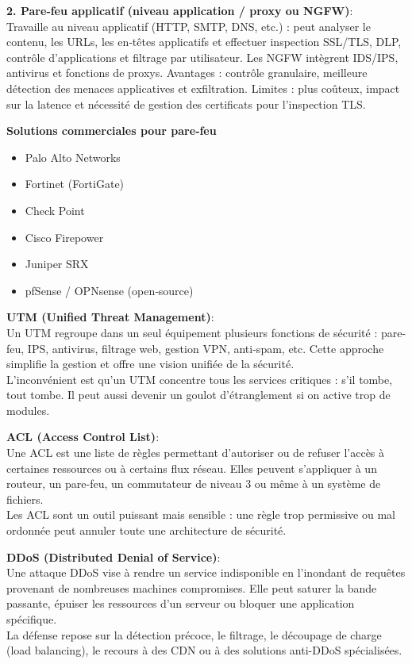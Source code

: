 \noindent \textbf{2. Pare‑feu applicatif (niveau application / proxy ou NGFW)}:\\
Travaille au niveau applicatif (HTTP, SMTP, DNS, etc.) : peut analyser le contenu, les URLs, les en‑têtes applicatifs et effectuer inspection SSL/TLS, DLP, contrôle d'applications et filtrage par utilisateur. Les NGFW intègrent IDS/IPS, antivirus et fonctions de proxys.  
Avantages : contrôle granulaire, meilleure détection des menaces applicatives et exfiltration. Limites : plus coûteux, impact sur la latence et nécessité de gestion des certificats pour l'inspection TLS.

\textbf{Solutions commerciales pour pare‑feu}
\begin{itemize}
  \item Palo Alto Networks
  \item Fortinet (FortiGate)
  \item Check Point
  \item Cisco Firepower
  \item Juniper SRX
  \item pfSense / OPNsense (open‑source)
\end{itemize}

\medskip

\noindent \textbf{UTM (Unified Threat Management)}:\\
Un UTM regroupe dans un seul équipement plusieurs fonctions de sécurité : pare-feu, IPS, antivirus, filtrage web, gestion VPN, anti-spam, etc. Cette approche simplifie la gestion et offre une vision unifiée de la sécurité.\\
L’inconvénient est qu’un UTM concentre tous les services critiques : s’il tombe, tout tombe. Il peut aussi devenir un goulot d’étranglement si on active trop de modules.

\medskip

\noindent \textbf{ACL (Access Control List)}:\\
Une ACL est une liste de règles permettant d’autoriser ou de refuser l’accès à certaines ressources ou à certains flux réseau. Elles peuvent s’appliquer à un routeur, un pare-feu, un commutateur de niveau 3 ou même à un système de fichiers.\\
Les ACL sont un outil puissant mais sensible : une règle trop permissive ou mal ordonnée peut annuler toute une architecture de sécurité.

\medskip

\noindent \textbf{DDoS (Distributed Denial of Service)}:\\
Une attaque DDoS vise à rendre un service indisponible en l’inondant de requêtes provenant de nombreuses machines compromises. Elle peut saturer la bande passante, épuiser les ressources d’un serveur ou bloquer une application spécifique.\\
La défense repose sur la détection précoce, le filtrage, le découpage de charge (load balancing), le recours à des CDN ou à des solutions anti-DDoS spécialisées.

